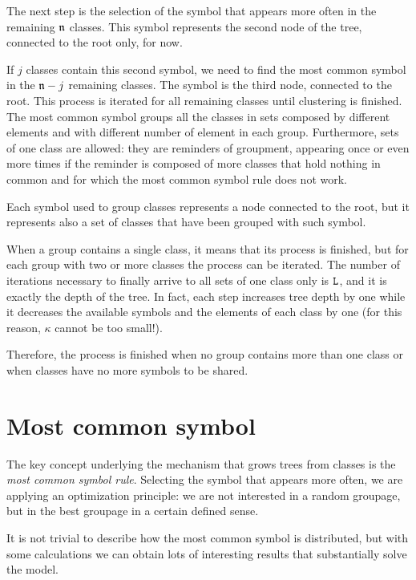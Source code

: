 The next step is the selection of the symbol that appears more often in the remaining $\mathfrak n$ classes. This symbol represents the second node of the tree, connected to the root only, for now.  

If $j$ classes contain this second symbol, we need to find the most common symbol in the $\mathfrak n-j$ remaining classes. The symbol is the third node, connected to the root. This process is iterated for all remaining classes until clustering is finished. The most common symbol groups all the classes in sets composed by different elements and with different number of element in each group. Furthermore, sets of one class are allowed: they are reminders of groupment, appearing once or even more times if the reminder is composed of more classes that hold nothing in common and for which the most common symbol rule does not work.

Each symbol used to group classes represents a node connected to the root, but it represents also a set of classes that have been grouped with such symbol.

When a group contains a single class, it means that its process is finished, but for each group with two or more classes the process can be iterated. The number of iterations necessary to finally arrive to all sets of one class only is $\mathtt L$, and it is exactly the depth of the tree. In fact, each step increases tree depth by one while it decreases the available symbols and the elements of each class by one (for this reason, $\kappa$ cannot be too small!).

Therefore, the process is finished when no group contains more than one class or when classes have no more symbols to be shared.

\section{Most common symbol}
The key concept underlying the mechanism that grows trees from classes is the \textit{most common symbol rule}. Selecting the symbol that appears more often, we are applying an optimization principle: we are not interested in a random groupage, but in the best groupage in a certain defined sense.

It is not trivial to describe how the most common symbol is distributed, but with some calculations we can obtain lots of interesting results that substantially solve the model.

